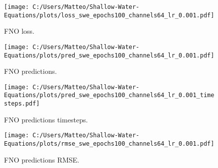 \begin{figure}[H]
    \centering
    \texttt{[image: C:/Users/Matteo/Shallow-Water-Equations/plots/loss\_swe\_epochs100\_channels64\_lr\_0.001.pdf]}
    \caption{FNO loss.}
\end{figure}

\begin{figure}[H]
    \centering
    \texttt{[image: C:/Users/Matteo/Shallow-Water-Equations/plots/pred\_swe\_epochs100\_channels64\_lr\_0.001.pdf]}
    \caption{FNO predictions.}
\end{figure}

\begin{figure}[H]
    \centering
    \texttt{[image: C:/Users/Matteo/Shallow-Water-Equations/plots/pred\_swe\_epochs100\_channels64\_lr\_0.001\_timesteps.pdf]}
    \caption{FNO predictions timesteps.}
\end{figure}

\begin{figure}[H]
    \centering
    \texttt{[image: C:/Users/Matteo/Shallow-Water-Equations/plots/rmse\_swe\_epochs100\_channels64\_lr\_0.001.pdf]}
    \caption{FNO predictions RMSE.}
\end{figure}



